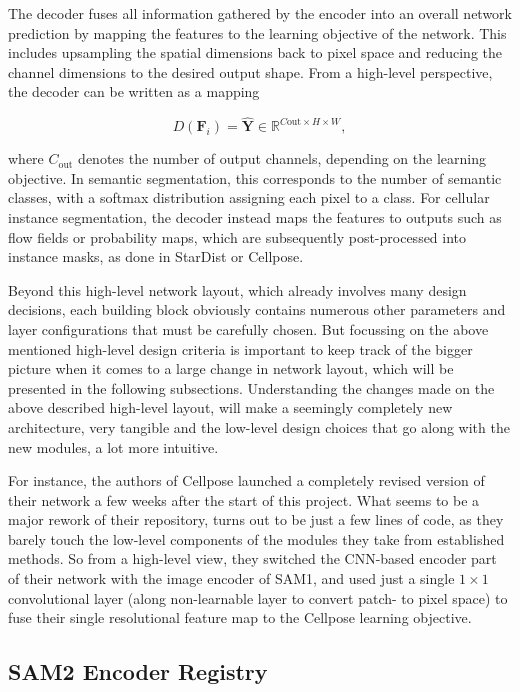 The decoder fuses all information gathered by the encoder into an overall network prediction by mapping the features to the learning objective of the network. This includes upsampling the spatial dimensions back to pixel space and reducing the channel dimensions to the desired output shape. From a high-level perspective, the decoder can be written as a mapping

\begin{equation}
D({\mathbf{F}_i}) = \hat{\mathbf{Y}} \in \mathbb{R}^{C\text{out} \times H \times W},
\end{equation}

where $C_\text{out}$ denotes the number of output channels, depending on the learning objective. In semantic segmentation, this corresponds to the number of semantic classes, with a softmax distribution assigning each pixel to a class. For cellular instance segmentation, the decoder instead maps the features to outputs such as flow fields or probability maps, which are subsequently post-processed into instance masks, as done in StarDist or Cellpose.

Beyond this high-level network layout, which already involves many design decisions, each building block obviously contains numerous other parameters and layer configurations that must be carefully chosen. But focussing on the above mentioned high-level design criteria is important to keep track of the bigger picture when it comes to a large change in network layout, which will be presented in the following subsections. Understanding the changes made on the above described high-level layout, will make a seemingly completely new architecture, very tangible and the low-level design choices that go along with the new modules, a lot more intuitive.

For instance, the authors of Cellpose launched a completely revised version of their network a few weeks after the start of this project. What seems to be a major rework of their repository, turns out to be just a few lines of code, as they barely touch the low-level components of the modules they take from established methods. So from a high-level view, they switched the CNN-based encoder part of their network with the image encoder of SAM1, and used just a single $1\times1$ convolutional layer (along non-learnable layer to convert patch- to pixel space) to fuse their single resolutional feature map to the Cellpose learning objective.



\subsection{SAM2 Encoder Registry}



